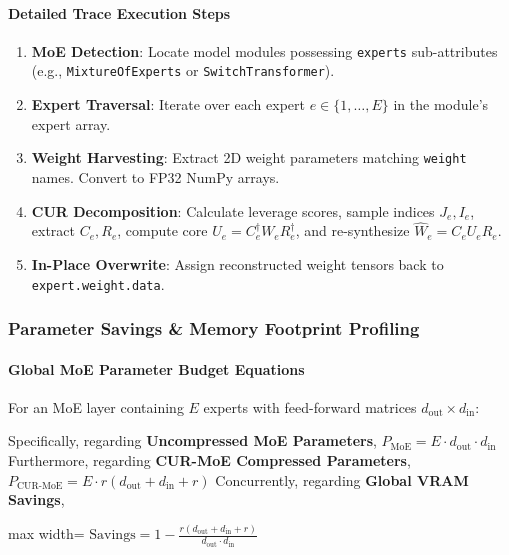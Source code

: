 \paragraph{Detailed Trace Execution Steps}
\begin{enumerate}
\item \textbf{MoE Detection}: Locate model modules possessing \texttt{experts} sub-attributes (e.g., \texttt{MixtureOfExperts} or \texttt{SwitchTransformer}).
\item \textbf{Expert Traversal}: Iterate over each expert $e \in \{1, \dots, E\}$ in the module's expert array.
\item \textbf{Weight Harvesting}: Extract 2D weight parameters matching \texttt{weight} names. Convert to FP32 NumPy arrays.
\item \textbf{CUR Decomposition}: Calculate leverage scores, sample indices $J_e, I_e$, extract $C_e, R_e$, compute core $U_e = C_e^\dagger W_e R_e^\dagger$, and re-synthesize $\hat{W}_e = C_e U_e R_e$.
\item \textbf{In-Place Overwrite}: Assign reconstructed weight tensors back to \texttt{expert.weight.data}.


\end{enumerate}
\subsubsection*{Parameter Savings \& Memory Footprint Profiling}

\paragraph{Global MoE Parameter Budget Equations}
For an MoE layer containing $E$ experts with feed-forward matrices $d_{\text{out}} \times d_{\text{in}}$:

Specifically, regarding \textbf{Uncompressed MoE Parameters}, $P_{\text{MoE}} = E \cdot d_{\text{out}} \cdot d_{\text{in}}$ Furthermore, regarding \textbf{CUR-MoE Compressed Parameters}, $P_{\text{CUR-MoE}} = E \cdot r(d_{\text{out}} + d_{\text{in}} + r)$ Concurrently, regarding \textbf{Global VRAM Savings},

\begin{center}
\begin{adjustbox}{max width=\columnwidth}
$\displaystyle
\text{Savings} = 1 - \frac{r(d_{\text{out}} + d_{\text{in}} + r)}{d_{\text{out}} \cdot d_{\text{in}}}
$
\end{adjustbox}
\end{center}

